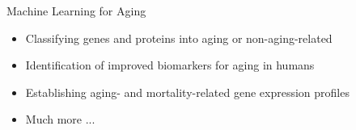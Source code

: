 \begin{frame}[c]{Machine Learning for Aging}
    \large
    \begin{itemize}[<+(1)->]
        \item Classifying genes and proteins into aging or non-aging-related \cite{townes2020identifying}
        \item Identification of improved biomarkers for aging in humans \cite{putin2016deep} %
        \item Establishing aging- and mortality-related gene expression profiles \cite{kerber2009gene}
        \item Much more ...
    \end{itemize}
\end{frame}


